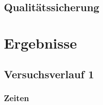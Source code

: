 \documentclass[12pt,a4paper]{scrartcl}
\begin{document}

\subsection{Qualitätssicherung}

\section{Ergebnisse}
\subsection{Versuchsverlauf 1}
\subsubsection{Zeiten}
\end{document}

